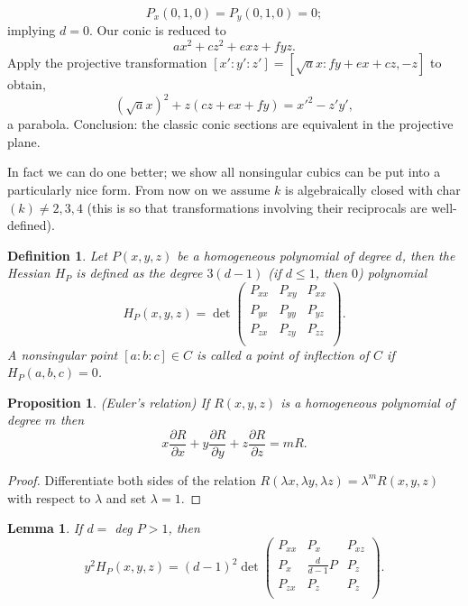 \documentclass{article}
\newtheorem{proposition}{Proposition}
\newtheorem*{lemma*}{Lemma}
\newtheorem*{definition}{Definition}
\theoremstyle{remark}
\begin{document}
\[P_x(0,1,0)=P_y(0,1,0)=0;  \]
implying $d=0$. Our conic is reduced to 
\[ax^2+cz^2+exz+fyz.\]
Apply the projective transformation  $[x':y':z']= [\sqrt{a}x:fy+ex+cz,-z]$ to obtain,
\[(\sqrt{a}x)^2 +z(cz+ex+fy)=x'^{2}-z'y',\]
a parabola. Conclusion: the classic conic sections are equivalent in the projective plane. 
\par
In fact we can do one better; we show all nonsingular cubics can be put into a particularly nice form. From now on we assume $k$ is algebraically closed with char$(k)\neq 2,3,4$ (this is so that transformations involving their reciprocals are well-defined).
\begin{definition}
Let $P(x,y,z)$ be a homogeneous polynomial of degree $d$, then the Hessian $H_P$ is defined as the degree $3(d-1)$ (if $d\leq 1$, then $0$) polynomial
\[ H_P (x,y,z) = \det 
\begin{pmatrix}
  P_{xx}                      &     P_{xy}                  & P_{xx}                       \\
   P_{yx}                     &     P_{yy}                  & P_{yz}                        \\
   P_{zx}                     &     P_{zy}                  & P_{zz}                        \\
 \end{pmatrix}.\]
A nonsingular point $[a:b:c]\in C$ is called a point of inflection of $C$ if $H_P (a,b,c)=0$.
\end{definition}
\begin{proposition} (Euler's relation) If $R(x,y,z)$ is a homogeneous polynomial of degree $m$ then
\[x\frac{\partial R}{\partial x}+ y\frac{\partial R}{\partial y}+z\frac{\partial R}{\partial z}=mR. \]
\end{proposition}
\begin{proof}
Differentiate both sides of the relation $R(\lambda x,\lambda y, \lambda z)=\lambda^m R(x,y,z)$ with respect to $\lambda$ and set $\lambda =1$.
\end{proof}
\begin{lemma*}
If $d=$ deg $P>1$, then 
\[ y^2 H_P(x,y,z)=(d-1)^2 \det 
\begin{pmatrix}
  P_{xx}                      &     P_{x}                  & P_{xz}                       \\
   P_{x}                     &  \frac{d}{d-1}P           & P_{z}                        \\
   P_{zx}                     &     P_{z}                  & P_{z}                        \\
 \end{pmatrix} .\]
\end{lemma*}
\end{document}

